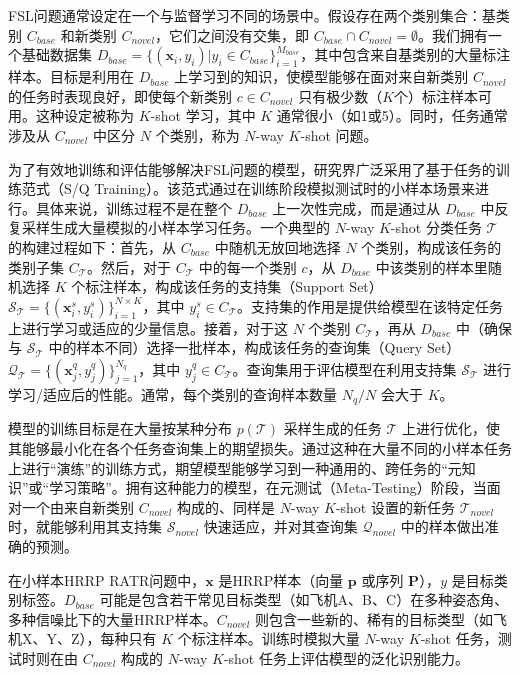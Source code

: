 FSL问题通常设定在一个与监督学习不同的场景中。假设存在两个类别集合：基类别 $C_{base}$ 和新类别 $C_{novel}$，它们之间没有交集，即 $C_{base} \cap C_{novel} = \emptyset$。我们拥有一个基础数据集 $D_{base} = \{(\mathbf{x}_i, y_i) | y_i \in C_{base}\}_{i=1}^{M_{base}}$，其中包含来自基类别的大量标注样本。目标是利用在 $D_{base}$ 上学习到的知识，使模型能够在面对来自新类别 $C_{novel}$ 的任务时表现良好，即使每个新类别 $c \in C_{novel}$ 只有极少数（$K$个）标注样本可用。这种设定被称为 $K$-shot 学习，其中 $K$ 通常很小（如1或5）。同时，任务通常涉及从 $C_{novel}$ 中区分 $N$ 个类别，称为 $N$-way $K$-shot 问题。

为了有效地训练和评估能够解决FSL问题的模型，研究界广泛采用了基于任务的训练范式（S/Q Training）。该范式通过在训练阶段模拟测试时的小样本场景来进行。具体来说，训练过程不是在整个 $D_{base}$ 上一次性完成，而是通过从 $D_{base}$ 中反复采样生成大量模拟的小样本学习任务。一个典型的 $N$-way $K$-shot 分类任务 $\mathcal{T}$ 的构建过程如下：首先，从 $C_{base}$ 中随机无放回地选择 $N$ 个类别，构成该任务的类别子集 $C_{\mathcal{T}}$。然后，对于 $C_{\mathcal{T}}$ 中的每一个类别 $c$，从 $D_{base}$ 中该类别的样本里随机选择 $K$ 个标注样本，构成该任务的支持集（Support Set） $\mathcal{S}_{\mathcal{T}} = \{(\mathbf{x}_i^s, y_i^s)\}_{i=1}^{N \times K}$，其中 $y_i^s \in C_{\mathcal{T}}$。支持集的作用是提供给模型在该特定任务上进行学习或适应的少量信息。接着，对于这 $N$ 个类别 $C_{\mathcal{T}}$，再从 $D_{base}$ 中（确保与 $\mathcal{S}_{\mathcal{T}}$ 中的样本不同）选择一批样本，构成该任务的查询集（Query Set） $\mathcal{Q}_{\mathcal{T}} = \{(\mathbf{x}_j^q, y_j^q)\}_{j=1}^{N_q}$，其中 $y_j^q \in C_{\mathcal{T}}$。查询集用于评估模型在利用支持集 $\mathcal{S}_{\mathcal{T}}$ 进行学习/适应后的性能。通常，每个类别的查询样本数量 $N_q/N$ 会大于 $K$。

模型的训练目标是在大量按某种分布 $p(\mathcal{T})$ 采样生成的任务 $\mathcal{T}$ 上进行优化，使其能够最小化在各个任务查询集上的期望损失。通过这种在大量不同的小样本任务上进行“演练”的训练方式，期望模型能够学习到一种通用的、跨任务的“元知识”或“学习策略”。拥有这种能力的模型，在元测试（Meta-Testing）阶段，当面对一个由来自新类别 $C_{novel}$ 构成的、同样是 $N$-way $K$-shot 设置的新任务 $\mathcal{T}_{novel}$ 时，就能够利用其支持集 $\mathcal{S}_{novel}$ 快速适应，并对其查询集 $\mathcal{Q}_{novel}$ 中的样本做出准确的预测。

在小样本HRRP RATR问题中，$\mathbf{x}$ 是HRRP样本（向量 $\mathbf{p}$ 或序列 $\mathbf{P}$），$y$ 是目标类别标签。$D_{base}$ 可能是包含若干常见目标类型（如飞机A、B、C）在多种姿态角、多种信噪比下的大量HRRP样本。$C_{novel}$ 则包含一些新的、稀有的目标类型（如飞机X、Y、Z），每种只有 $K$ 个标注样本。训练时模拟大量 $N$-way $K$-shot 任务，测试时则在由 $C_{novel}$ 构成的 $N$-way $K$-shot 任务上评估模型的泛化识别能力。

